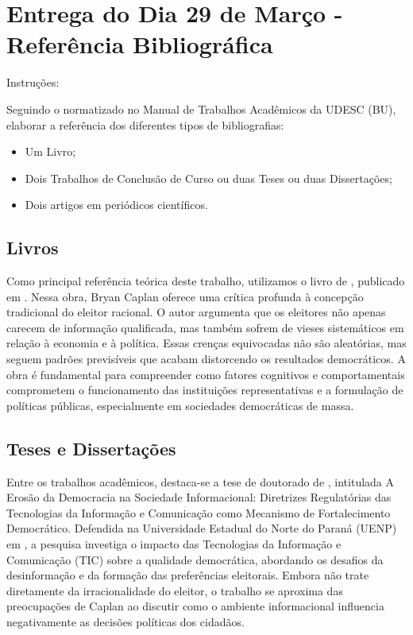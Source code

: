 
\chapter{Entrega do Dia 29 de Março - Referência Bibliográfica}

Instruções:

Seguindo o normatizado no Manual de Trabalhos Acadêmicos da UDESC (BU), elaborar a referência dos diferentes tipos de bibliografias:

\begin{itemize}
    \item Um Livro;
    \item Dois Trabalhos de Conclusão de Curso ou duas Teses ou duas Dissertações;
    \item Dois artigos em periódicos científicos.
\end{itemize}

\section{Livros}

Como principal referência teórica deste trabalho, utilizamos o livro de , publicado em \citeyear{The_Myth_of_the_Rational_Voter}. Nessa obra, Bryan Caplan oferece uma crítica profunda à concepção tradicional do eleitor racional. O autor argumenta que os eleitores não apenas carecem de informação qualificada, mas também sofrem de vieses sistemáticos em relação à economia e à política. Essas crenças equivocadas não são aleatórias, mas seguem padrões previsíveis que acabam distorcendo os resultados democráticos. A obra é fundamental para compreender como fatores cognitivos e comportamentais comprometem o funcionamento das instituições representativas e a formulação de políticas públicas, especialmente em sociedades democráticas de massa.

\section{Teses e Dissertações}

Entre os trabalhos acadêmicos, destaca-se a tese de doutorado de , intitulada A Erosão da Democracia na Sociedade Informacional: Diretrizes Regulatórias das Tecnologias da Informação e Comunicação como Mecanismo de Fortalecimento Democrático. Defendida na Universidade Estadual do Norte do Paraná (UENP) em \citeyear{souza2022erosao}, a pesquisa investiga o impacto das Tecnologias da Informação e Comunicação (TIC) sobre a qualidade democrática, abordando os desafios da desinformação e da formação das preferências eleitorais. Embora não trate diretamente da irracionalidade do eleitor, o trabalho se aproxima das preocupações de Caplan ao discutir como o ambiente informacional influencia negativamente as decisões políticas dos cidadãos.

